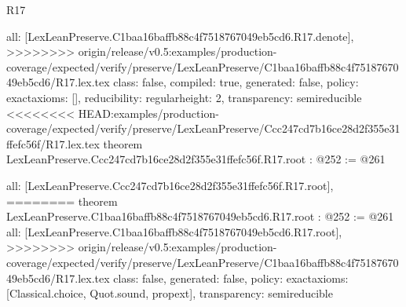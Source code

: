 \begin{lexlean}{R17}
\begin{coremodule}
{{{{{  all: [LexLeanPreserve.C1baa16baffb88c4f7518767049eb5cd6.R17.denote],
>>>>>>>> origin/release/v0.5:examples/production-coverage/expected/verify/preserve/LexLeanPreserve/C1baa16baffb88c4f7518767049eb5cd6/R17.lex.tex
  class: false,
  compiled: true,
  generated: false,
  policy: exact{axioms: []},
  reducibility: regular{height: 2},
  transparency: semireducible
}
<<<<<<<< HEAD:examples/production-coverage/expected/verify/preserve/LexLeanPreserve/Ccc247cd7b16ce28d2f355e31ffefc56f/R17.lex.tex
theorem LexLeanPreserve.Ccc247cd7b16ce28d2f355e31ffefc56f.R17.root : @252 := @261 {
  all: [LexLeanPreserve.Ccc247cd7b16ce28d2f355e31ffefc56f.R17.root],
========
theorem LexLeanPreserve.C1baa16baffb88c4f7518767049eb5cd6.R17.root : @252 := @261 {
  all: [LexLeanPreserve.C1baa16baffb88c4f7518767049eb5cd6.R17.root],
>>>>>>>> origin/release/v0.5:examples/production-coverage/expected/verify/preserve/LexLeanPreserve/C1baa16baffb88c4f7518767049eb5cd6/R17.lex.tex
  class: false,
  generated: false,
  policy: exact{axioms: [Classical.choice, Quot.sound, propext]},
  transparency: semireducible
}

}}}}}
\end{coremodule}
\end{lexlean}
